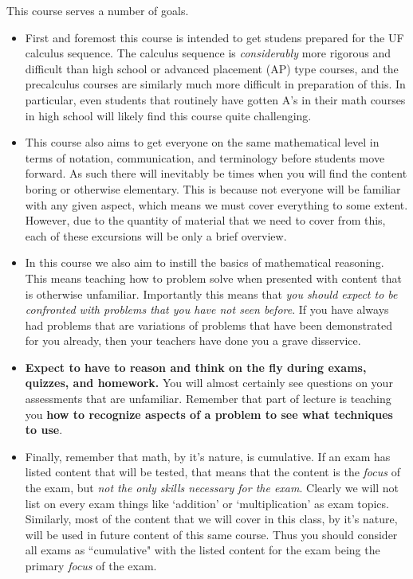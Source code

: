 \documentclass{ximeraXloud}
\begin{document}
This course serves a number of goals. 
\begin{itemize}
    \item First and foremost this course is intended to get studens prepared for the UF calculus sequence. The calculus sequence is \textit{considerably} more rigorous and difficult than high school or advanced placement (AP) type courses, and the precalculus courses are similarly much more difficult in preparation of this. In particular, even students that routinely have gotten A's in their math courses in high school will likely find this course quite challenging.
    \item This course also aims to get everyone on the same mathematical level in terms of notation, communication, and terminology before students move forward. As such there will inevitably be times when you will find the content boring or otherwise elementary. This is because not everyone will be familiar with any given aspect, which means we must cover everything to some extent. However, due to the quantity of material that we need to cover from this, each of these excursions will be only a brief overview.
    \item In this course we also aim to instill the basics of mathematical reasoning. This means teaching how to problem solve when presented with content that is otherwise unfamiliar. Importantly this means that \textit{you should expect to be confronted with problems that you have not seen before}. If you have always had problems that are variations of problems that have been demonstrated for you already, then your teachers have done you a grave disservice. 
    \item \textbf{Expect to have to reason and think on the fly during exams, quizzes, and homework.} You will almost certainly see questions on your assessments that are unfamiliar. Remember that part of lecture is teaching you \textbf{how to recognize aspects of a problem to see what techniques to use}.
    \item Finally, remember that math, by it's nature, is cumulative. If an exam has listed content that will be tested, that means that the content is the \textit{focus} of the exam, but \textit{not the only skills necessary for the exam}. Clearly we will not list on every exam things like `addition' or `multiplication' as exam topics. Similarly, most of the content that we will cover in this class, by it's nature, will be used in future content of this same course. Thus you should consider all exams as ``cumulative" with the listed content for the exam being the primary \textit{focus} of the exam.
\end{itemize}
\end{document}
